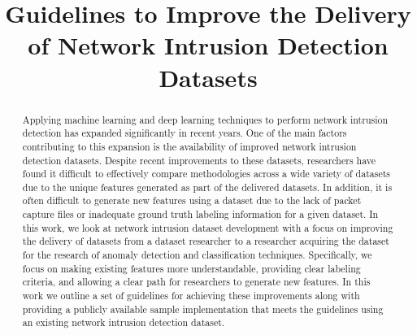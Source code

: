 \documentclass[conference]{IEEEtran}
\begin{document}
\title{Guidelines to Improve the Delivery of Network Intrusion Detection Datasets}

\author{
\and
{}
}

\maketitle

\begin{abstract}
    Applying machine learning and deep learning techniques to perform network intrusion detection has expanded significantly in recent years.
    One of the main factors contributing to this expansion is the availability of improved network intrusion detection datasets.
    Despite recent improvements to these datasets, researchers have found it difficult to effectively compare methodologies across a wide variety of datasets due to the unique features generated as part of the delivered datasets.
    In addition, it is often difficult to generate new features using a dataset due to the lack of packet capture files or inadequate ground truth labeling information for a given dataset.
    In this work, we look at network intrusion dataset development with a focus on improving the delivery of datasets from a dataset researcher to a researcher acquiring the dataset for the research of anomaly detection and classification techniques.
    Specifically, we focus on making existing features more understandable, providing clear labeling criteria, and allowing a clear path for researchers to generate new features.
    In this work we outline a set of guidelines for achieving these improvements along with providing a publicly available sample implementation that meets the guidelines using an existing network intrusion detection dataset.
\end{abstract}
\end{document}
